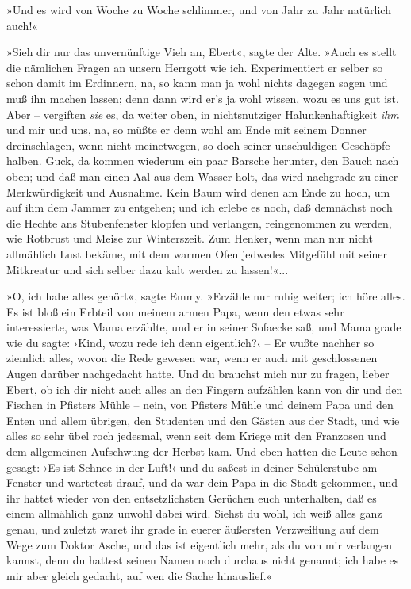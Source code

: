 »Und es wird von Woche zu Woche schlimmer, und von Jahr zu Jahr
natürlich auch!«

»Sieh dir nur das unvernünftige Vieh an, Ebert«, sagte der Alte.
»Auch es stellt die nämlichen Fragen an unsern Herrgott wie ich.
Experimentiert er selber so schon damit im Erdinnern, na, so kann
man ja wohl nichts dagegen sagen und muß ihn machen lassen; denn
dann wird er's ja wohl wissen, wozu es uns gut ist. Aber –
vergiften \emph{sie} es, da weiter oben, in nichtsnutziger
Halunkenhaftigkeit \emph{ihm} und mir und uns, na, so müßte er denn
wohl am Ende mit seinem Donner dreinschlagen, wenn nicht
meinetwegen, so doch seiner unschuldigen Geschöpfe halben. Guck, da
kommen wiederum ein paar Barsche herunter, den Bauch nach oben; und
daß man einen Aal aus dem Wasser holt, das wird nachgrade zu einer
Merkwürdigkeit und Ausnahme. Kein Baum wird denen am Ende zu hoch,
um auf ihm dem Jammer zu entgehen; und ich erlebe es noch, daß
demnächst noch die Hechte ans Stubenfenster klopfen und verlangen,
reingenommen zu werden, wie Rotbrust und Meise zur Winterszeit. Zum
Henker, wenn man nur nicht allmählich Lust bekäme, mit dem warmen
Ofen jedwedes Mitgefühl mit seiner Mitkreatur und sich selber dazu
kalt werden zu lassen!«...

»O, ich habe alles gehört«, sagte Emmy. »Erzähle nur ruhig weiter;
ich höre alles. Es ist bloß ein Erbteil von meinem armen Papa, wenn
den etwas sehr interessierte, was Mama erzählte, und er in seiner
Sofaecke saß, und Mama grade wie du sagte: ›Kind, wozu rede ich
denn eigentlich?‹ – Er wußte nachher so ziemlich alles, wovon die
Rede gewesen war, wenn er auch mit geschlossenen Augen darüber
nachgedacht hatte. Und du brauchst mich nur zu fragen, lieber
Ebert, ob ich dir nicht auch alles an den Fingern aufzählen kann
von dir und den Fischen in Pfisters Mühle – nein, von Pfisters
Mühle und deinem Papa und den Enten und allem übrigen, den
Studenten und den Gästen aus der Stadt, und wie alles so sehr übel
roch jedesmal, wenn seit dem Kriege mit den Franzosen und dem
allgemeinen Aufschwung der Herbst kam. Und eben hatten die Leute
schon gesagt: ›Es ist Schnee in der Luft!‹ und du saßest in deiner
Schülerstube am Fenster und wartetest drauf, und da war dein Papa
in die Stadt gekommen, und ihr hattet wieder von den
entsetzlichsten Gerüchen euch unterhalten, daß es einem allmählich
ganz unwohl dabei wird. Siehst du wohl, ich weiß alles ganz genau,
und zuletzt waret ihr grade in euerer äußersten Verzweiflung auf
dem Wege zum Doktor Asche, und das ist eigentlich mehr, als du von
mir verlangen kannst, denn du hattest seinen Namen noch durchaus
nicht genannt; ich habe es mir aber gleich gedacht, auf wen die
Sache hinauslief.«

